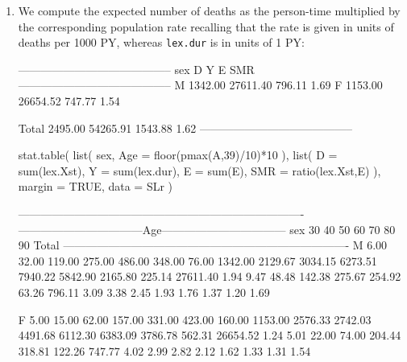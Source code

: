 \begin{enumerate}[resume]
    
\item We compute the expected number of deaths as the person-time
   multiplied by the corresponding population rate recalling that the
   rate is given in units of deaths per 1000 PY, whereas
   \texttt{lex.dur} is in units of 1 PY:
\begin{Schunk}
\begin{Soutput}
 ----------------------------------------- 
 sex           D        Y       E     SMR  
 ----------------------------------------- 
 M       1342.00 27611.40  796.11    1.69  
 F       1153.00 26654.52  747.77    1.54  
                                           
 Total   2495.00 54265.91 1543.88    1.62  
 ----------------------------------------- 
\end{Soutput}
\begin{Sinput}
 stat.table( list( sex, Age = floor(pmax(A,39)/10)*10 ), 
             list( D = sum(lex.Xst), 
                   Y = sum(lex.dur), 
                   E = sum(E), 
                 SMR = ratio(lex.Xst,E) ), 
              margin = TRUE,
                data = SLr )
\end{Sinput}
\begin{Soutput}
 ---------------------------------------------------------------------------- 
        ---------------------------------Age--------------------------------- 
 sex          30      40       50       60       70      80      90    Total  
 ---------------------------------------------------------------------------- 
 M          6.00   32.00   119.00   275.00   486.00  348.00   76.00  1342.00  
         2129.67 3034.15  6273.51  7940.22  5842.90 2165.80  225.14 27611.40  
            1.94    9.47    48.48   142.38   275.67  254.92   63.26   796.11  
            3.09    3.38     2.45     1.93     1.76    1.37    1.20     1.69  
                                                                              
 F          5.00   15.00    62.00   157.00   331.00  423.00  160.00  1153.00  
         2576.33 2742.03  4491.68  6112.30  6383.09 3786.78  562.31 26654.52  
            1.24    5.01    22.00    74.00   204.44  318.81  122.26   747.77  
            4.02    2.99     2.82     2.12     1.62    1.33    1.31     1.54  
                                                                              

\end{Soutput}
\end{Schunk}
\end{enumerate}

